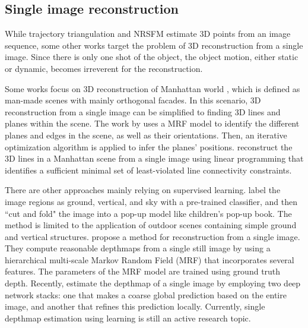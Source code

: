 \subsection{Single image reconstruction}
While trajectory triangulation and NRSFM estimate 3D points from an image sequence, some other works target the problem of 3D reconstruction from a single image. Since there is only one shot of the object, the object motion, either static or dynamic, becomes irreverent for the reconstruction. 

Some works focus on 3D reconstruction of Manhattan world \cite{Coughlan_ICCV99}, which is defined as
man-made scenes with mainly orthogonal facades. In this scenario, 3D reconstruction from a single image can be simplified to finding 3D lines and planes within the scene. The work by \citet{Delage_ISRR2005} uses a MRF model to identify the different planes and edges in the scene, as well as their orientations. Then, an iterative optimization algorithm is applied to infer the planes' positions. \citet{Ram_ICCV2013} reconstruct the 3D lines in a Manhattan scene from a single image using linear programming that identifies a sufficient minimal set of least-violated line connectivity constraints.

There are other approaches mainly relying on supervised learning. 
\citet{Hoiem_CGRAPH2005} label the image regions as ground, vertical, and sky with a pre-trained classifier, and then ``cut and fold" the image into a pop-up model like children's pop-up book. The method is limited to the application of outdoor scenes containing simple ground and vertical structures.
\citet{Saxena_IJCV2008} propose a method for reconstruction from a single image. They compute reasonable depthmaps from a single still image by using a hierarchical multi-scale Markov Random Field (MRF) that incorporates several features. The parameters of the MRF model are trained using ground truth depth.  Recently, \citet{eigen2014depth} estimate the depthmap of a single image by employing two deep network stacks: one that makes a coarse global prediction based on the entire image, and another that refines this prediction locally. Currently, single depthmap estimation using learning is still an active research topic.


















